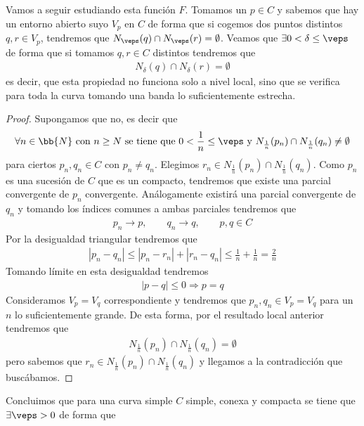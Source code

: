 Vamos a seguir estudiando esta función $F$. Tomamos un $p\in C$ y sabemos que hay un entorno abierto suyo $V_p$ en $C$ de forma que si cogemos dos puntos distintos $q,r\in V_p$, tendremos que $N_\veps(q)\cap N_\veps(r) = \emptyset$. Veamos que $\exists 0 < \delta \leq \veps$ de forma que si tomamos $q,r\in C$ distintos tendremos que 
\begin{gather*}
    N_\delta(q) \cap N_\delta(r) = \emptyset
\end{gather*}
es decir, que esta propiedad no funciona solo a nivel local, sino que se verifica para toda la curva tomando una banda lo suficientemente estrecha.
\begin{proof}
    Supongamos que no, es decir que
    \begin{gather*}
        \forall n\in \bb{N} \text{ con } n\geq N \text{ se tiene que } 0<\frac{1}{n}\leq \veps \text{ y } N_{\frac{1}{n}}(p_n)\cap N_{\frac{1}{n}}(q_n) \neq \emptyset
    \end{gather*}
    para ciertos $p_n,q_n\in C$ con $p_n\neq q_n$. Elegimos $r_n\in  N_{\frac{1}{n}}(p_n)\cap N_{\frac{1}{n}}(q_n)$. Como $p_n$ es una sucesión de $C$ que es un compacto, tendremos que existe una parcial convergente de $p_n$ convergente. Análogamente existirá una parcial convergente de $q_n$ y tomando los índices comunes a ambas parciales tendremos que 
    \begin{gather*}
        p_n \longrightarrow p , \qquad q_n \longrightarrow q,\qquad p,q\in C
    \end{gather*}
    Por la desigualdad triangular tendremos que 
    \begin{gather*}
        |p_n - q_n| \leq |p_n - r_n| + |r_n-q_n| \leq \frac{1}{n} + \frac{1}{n} = \frac{2}{n}
    \end{gather*}
    Tomando límite en esta desigualdad tendremos 
    \begin{gather*}
        |p-q| \leq 0 \Rightarrow p=q
    \end{gather*}
    Consideramos $V_p=V_q$ correspondiente y tendremos que $p_n,q_n\in V_p=V_q$ para un $n$ lo suficientemente grande. De esta forma, por el resultado local anterior tendremos que 
    \begin{gather*}
        N_{\frac{1}{n}}(p_n)\cap N_{\frac{1}{n}}(q_n) = \emptyset
    \end{gather*} 
    pero sabemos que $r_n\in N_{\frac{1}{n}}(p_n)\cap N_{\frac{1}{n}}(q_n)$ y llegamos a la contradicción que buscábamos.
\end{proof}
Concluimos que para una curva simple $C$ simple, conexa y compacta se tiene que $\exists \veps>0$ de forma que 
